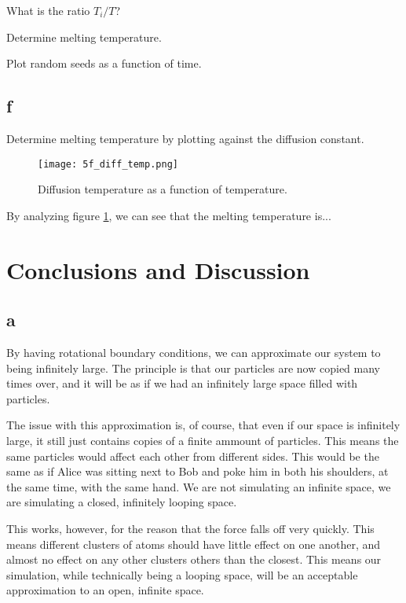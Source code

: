 \documentclass[10pt,showpacs,preprintnumbers,footinbib,amsmath,amssymb,aps,prl,twocolumn,groupedaddress,superscriptaddress,showkeys]{revtex4-1}
\begin{document}
What is the ratio $T_i/T$?

Determine melting temperature.

Plot random seeds as a function of time.

\subsection*{f}

Determine melting temperature by plotting against the diffusion constant.

\begin{figure}
	\centering
	\texttt{[image: 5f\_diff\_temp.png]}
	\caption{Diffusion temperature as a function of temperature.}
	\label{fig:5f_diff_temp}
\end{figure}

By analyzing figure \ref{fig:5f_diff_temp}, we can see that the melting temperature is...

\section{Conclusions and Discussion}

\subsection*{a}

By having rotational boundary conditions, we can approximate our system to being infinitely large. The principle is that our particles are now copied many times over, and it will be as if we had an infinitely large space filled with particles.

The issue with this approximation is, of course, that even if our space is infinitely large, it still just contains copies of a finite ammount of particles. This means the same particles would affect each other from different sides. This would be the same as if Alice was sitting next to Bob and poke him in both his shoulders, at the same time, with the same hand. We are not simulating an infinite space, we are simulating a closed, infinitely looping space.

This works, however, for the reason that the force falls off very quickly. This means different clusters of atoms should have little effect on one another, and almost no effect on any other clusters others than the closest. This means our simulation, while technically being a looping space, will be an acceptable approximation to an open, infinite space.
\end{document}
